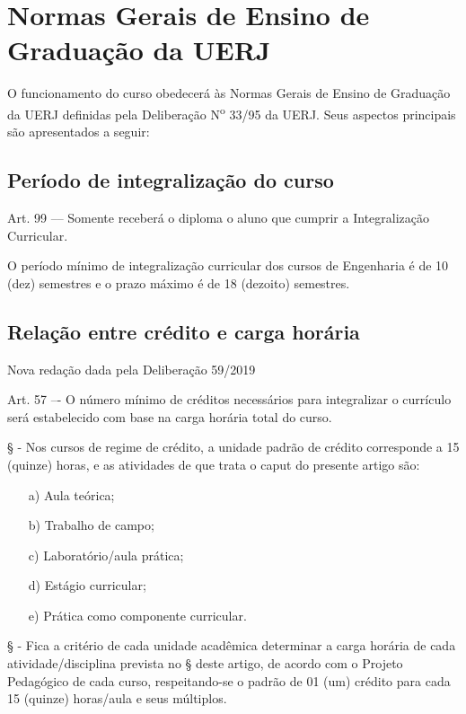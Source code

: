 \section{Normas Gerais de Ensino de Graduação da UERJ}

O funcionamento do curso obedecerá às Normas Gerais de Ensino de Graduação da UERJ definidas pela Deliberação N\textsuperscript{o} 33/95 da UERJ. Seus aspectos principais são apresentados a seguir:

\subsection{Período de integralização do curso}
\begin{quoting}
    Art. 99 –-- Somente receberá o diploma o aluno que cumprir a Integralização Curricular.
\end{quoting}

O período mínimo de integralização curricular dos cursos de Engenharia é de 10 (dez) semestres e o prazo máximo é de 18 (dezoito) semestres.

\subsection{Relação entre crédito e carga horária}
Nova redação dada pela Deliberação  59/2019
\begin{quoting}
    Art. 57 –- O número mínimo de créditos necessários para integralizar o
    currículo será estabelecido com base na carga horária total do curso.


    \S {} - Nos cursos de regime de crédito, a unidade padrão de crédito
    corresponde a 15 (quinze) horas, e as atividades de que trata o caput do
    presente artigo são:
    \begin{itemize}
        \item[a)] Aula teórica;
        \item[b)] Trabalho de campo;
        \item[c)] Laboratório/aula prática;
        \item[d)] Estágio curricular;
        \item[e)] Prática como componente curricular.
    \end{itemize}

    \S {} - Fica a critério de cada unidade acadêmica determinar a carga horária de  cada atividade/disciplina prevista no \S{} deste artigo, de acordo com o Projeto Pedagógico de cada curso, respeitando-se o padrão de 01 (um) crédito para cada 15 (quinze) horas/aula e seus múltiplos.
\end{quoting}

